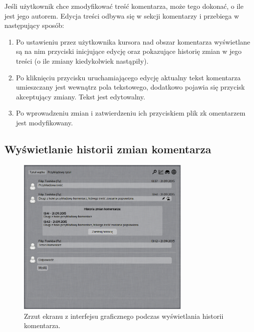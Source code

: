 Jeśli użytkownik chce zmodyfikować treść komentarza, może tego dokonać, o ile jest jego autorem. Edycja treści odbywa się w sekcji komentarzy i przebiega w następujący sposób:

\begin{enumerate}[noitemsep]
  \item Po ustawieniu przez użytkownika kursora nad obszar komentarza wyświetlane są na nim przyciski inicjujące edycję oraz pokazujące historię zmian w jego treści (o ile zmiany kiedykolwiek nastąpiły).
  
  \item Po kliknięciu przycisku uruchamiającego edycję aktualny tekst komentarza umieszczany jest wewnątrz pola tekstowego, dodatkowo pojawia się przycisk akceptujący zmiany. Tekst jest edytowalny.
  
  \item Po wprowadzeniu zmian i zatwierdzeniu ich przyciskiem plik zk omentarzem jest modyfikowany.
\end{enumerate}

\newpage

\subsection*{Wyświetlanie historii zmian komentarza}

\begin{figure}[h!]
  \vspace{5pt}
  \begin{center}
    \includegraphics[width=240pt]{figures/screenshotcommenthistory1.png}
  \end{center}
  \caption{Zrzut ekranu z interfejsu graficznego podczas wyświetlania historii komentarza.}
\end{figure}

